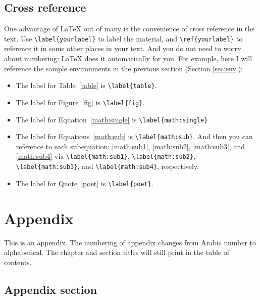 \documentclass[draft]{emory}
\begin{document}
\section{Cross reference}
One advantage of \LaTeX{} out of many is the convenience of cross reference in
the text. Use \Verb|\label{yourlabel}| to label the material, and \Verb|\ref{yourlabel}|
to reference it in some other places in your text. And you do not need to worry
about numbering: \LaTeX{} does it automatically for you. For example, here
I will reference the sample environments in the previous section (Section 
\ref{sec:env}):
\begin{itemize}
\item The label for Table~\ref{table} is \Verb|\label{table}|.
\item The label for Figure~\ref{fig} is \Verb|\label{fig}|.
\item The label for Equation~\ref{math:single} is \Verb|\label{math:single}|
\item The label for Equations~\ref{math:sub} is \Verb|\label{math:sub}|. And then
      you can reference to each subequation: \ref{math:sub1}, \ref{math:sub2}, 
      \ref{math:sub3}, and \ref{math:sub4} via \Verb|\label{math:sub1}|,
      \Verb|\label{math:sub2}|, \Verb|\label{math:sub3}|, and \Verb|\label{math:sub4}|,
      respectively.
\item The label for Quote~\ref{poet} is \Verb|\label{poet}|.
\end{itemize}


\appendix
\renewcommand{\chaptername}{Appendix}

\chapter{Appendix}
This is an appendix. The numbering of appendix changes from Arabic number to 
alphabetical.
The chapter and section titles will still print in the table of contents.

\section{Appendix section}
\end{document}
